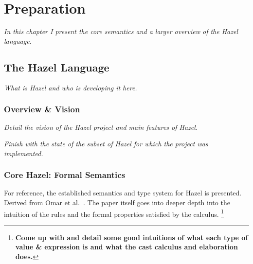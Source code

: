 \chapter{Preparation}
\textit{In this chapter I present the core semantics and a larger overview of the Hazel language.}
\section{The Hazel Language}
\textit{What is Hazel and who is developing it here.}

\subsection{Overview \& Vision}
\textit{Detail the vision of the Hazel project and main features of Hazel.}\par 
\textit{Finish with the state of the subset of Hazel for which the project was implemented.}

\subsection{\textbf{Core Hazel}: Formal Semantics}
For reference, the established semantics and type system for Hazel is presented. Derived from Omar et al.\ \cite{HazelLivePaper}. The paper itself goes into deeper depth into the intuition of the rules and the formal properties satisfied by the calculus.
\footnote{
\textbf{Come up with and detail some good intuitions of what each type of value \& expression is and what the cast calculus and elaboration does.}}
